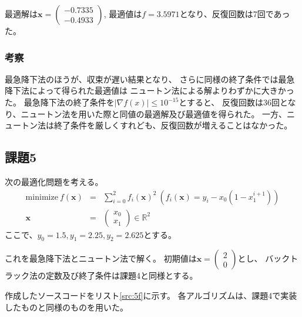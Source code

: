 \documentclass[a4j, titlepage]{jsarticle}
\numberwithin{equation}{section}
\begin{document}
            最適解は$\bm{x}=\begin{pmatrix}
                -0.7335 \\
                -0.4933
            \end{pmatrix}$, 最適値は$f=3.5971$となり、反復回数は7回であった。

        \subsubsection{考察}
            最急降下法のほうが、収束が遅い結果となり、
            さらに同様の終了条件では最急降下法によって得られた最適値は
            ニュートン法による解よりわずかに大きかった。
            最急降下法の終了条件を$|\nabla f(x)| \leq 10^{-15}$とすると、
            反復回数は36回となり、ニュートン法を用いた際と同値の最適解及び最適値を得られた。
            一方、ニュートン法は終了条件を厳しくすれども、反復回数が増えることはなかった。
    
    \subsection{課題5} \label{sec:kadai5}
        次の最適化問題を考える。
        \begin{eqnarray*}
            \mathrm{minimize} \ f(\bm{x}) &=& \sum_{i=0}^2f_i(\bm{x})^2 \ \left(f_i(\bm{x}) = y_i - x_0(1-x_1^{i+1})\right) \\
            \bm{x} &=& \begin{pmatrix}
                x_0 \\
                x_1
            \end{pmatrix} \in \mathbb{R}^2
        \end{eqnarray*}
        ここで、$y_0 = 1.5, y_1 = 2.25, y_2 = 2.625$とする。

        これを最急降下法とニュートン法で解く。
        初期値は$\bm{x}=\begin{pmatrix}
            2 \\
            0
        \end{pmatrix}$とし、
        バックトラック法の定数及び終了条件は課題4と同様とする。

        作成したソースコードをリスト\ref{src:5f}に示す。
        各アルゴリズムは、課題4で実装したものと同様のものを用いた。
        
\end{document}
